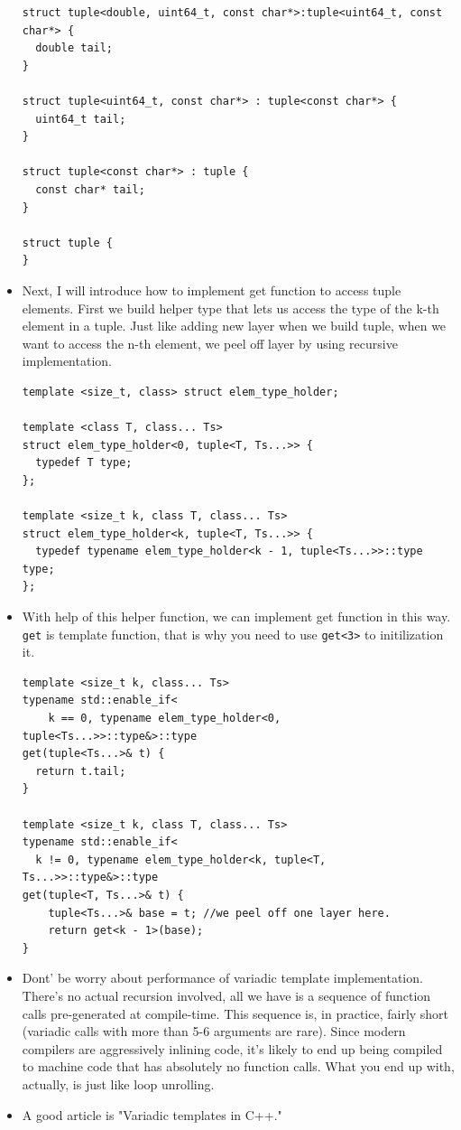 \documentclass[a4paper,11pt,twoside]{book}
\begin{document}
\begin{itemize}
\begin{lstlisting}
struct tuple<double, uint64_t, const char*>:tuple<uint64_t, const char*> {
  double tail;
}

struct tuple<uint64_t, const char*> : tuple<const char*> {
  uint64_t tail;
}

struct tuple<const char*> : tuple {
  const char* tail;
}

struct tuple {
}
\end{lstlisting}

    \item Next, I will introduce how to implement get function to access tuple elements. First we build helper type that lets us access the type of the k-th element in a tuple. Just like adding new layer when we build tuple, when we want to access the n-th element, we peel off layer by using recursive implementation.

\begin{lstlisting}
template <size_t, class> struct elem_type_holder;

template <class T, class... Ts>
struct elem_type_holder<0, tuple<T, Ts...>> {
  typedef T type;
};

template <size_t k, class T, class... Ts>
struct elem_type_holder<k, tuple<T, Ts...>> {
  typedef typename elem_type_holder<k - 1, tuple<Ts...>>::type type;
};
\end{lstlisting}
    \item With help of this helper function, we can implement get function in this way. \texttt{get} is template function, that is why you need to use \texttt{get<3>} to initilization it. 
\begin{lstlisting}
template <size_t k, class... Ts>
typename std::enable_if<
    k == 0, typename elem_type_holder<0, tuple<Ts...>>::type&>::type
get(tuple<Ts...>& t) {
  return t.tail;
}

template <size_t k, class T, class... Ts>
typename std::enable_if<
  k != 0, typename elem_type_holder<k, tuple<T, Ts...>>::type&>::type
get(tuple<T, Ts...>& t) {
    tuple<Ts...>& base = t; //we peel off one layer here. 
    return get<k - 1>(base);
}
\end{lstlisting}

    \item Dont' be worry about performance of variadic template implementation. There's no actual recursion involved, all we have is a sequence of function calls pre-generated at compile-time. This sequence is, in practice, fairly short (variadic calls with more than 5-6 arguments are rare). Since modern compilers are aggressively inlining code, it's likely to end up being compiled to machine code that has absolutely no function calls. What you end up with, actually, is just like loop unrolling.

    \item A good article is "Variadic templates in C++."

\end{itemize}
\end{document}
